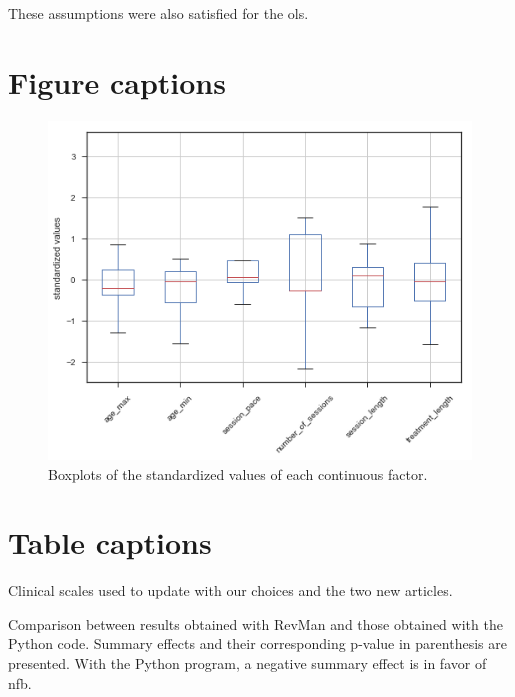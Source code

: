 \documentclass[12pt,a4paper,english]{article}
\begin{document}
These assumptions were also satisfied for the \gls{ols}.

\clearpage



\clearpage

\section*{Figure captions}

\begin{figure}[h!]
	\center
  \includegraphics[scale=0.5]{figures/factors_analysis_boxplot_no_colors_no_two_columns.png}
  \caption{Boxplots of the standardized values of each continuous factor.}
  \label{Figure:factors_analysis_boxplots}
\end{figure}

\section*{Table captions}

\begin{table}[h!]
  \centering
  \caption{Clinical scales used to update \citet{Cortese2016} with our choices and the two new articles.}

  \label{Table:Table_mr_clinical_scales_update_cortese}
\end{table}

\begin{table}[h!]
  \centering
  \caption{Comparison between \citet{Cortese2016} results obtained with RevMan \citep{RevMan} and those obtained with the Python code. Summary 
	effects and their corresponding p-value in parenthesis are presented. With the Python program, a negative summary effect is in favor of \gls{nfb}.}

  \label{Table:meta_review_comparison_between_revman_python}
\end{table}
\end{document}

